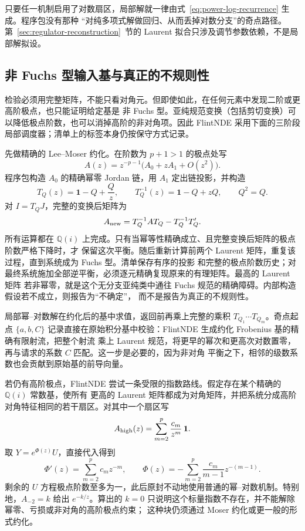 \documentclass[11pt,a4paper]{ctexart}
\newcommand{\Id}{\mathbf 1}
\renewcommand{\_}{\origunderscore\allowbreak}
\begin{document}
只要任一机制启用了对数扇区，局部解就一律由式~\eqref{eq:power-log-recurrence} 生成。程序包没有那种
“对纯多项式解做回归、从而丢掉对数分支”的奇点路径。第~\ref{sec:regulator-reconstruction}~节的 Laurent
拟合只涉及调节参数依赖，不是局部解拟设。


\subsection{非 Fuchs 型输入基与真正的不规则性}
\label{subsec:nonfuchsian}

检验必须用完整矩阵，不能只看对角元。但即使如此，在任何元素中发现二阶或更高阶极点，也只能证明给定基是
非 Fuchs 型。亚纯规范变换（包括剪切变换）可以降低极点阶数，也可以消掉高阶的非对角项。因此 FlintNDE
采用下面的三阶段局部调度器；清单上的标签本身仍按保守方式记录。

先做精确的 Lee--Moser 约化。在阶数为 $p+1>1$ 的极点处写
\begin{equation}
 A(z)=z^{-p-1}\bigl(A_0+zA_1+O(z^2)\bigr).
\end{equation}
程序包构造 $A_0$ 的精确幂零 Jordan 链，用 $A_1$ 定出链投影，并构造
\begin{equation}
 T_Q(z)=\Id-Q+\frac{Q}{z},\qquad
 T_Q^{-1}(z)=\Id-Q+zQ,\qquad Q^2=Q.
 \label{eq:moser-balance}
\end{equation}
对 $I=T_QJ$，完整的变换后矩阵为
\begin{equation}
 A_{\rm new}=T_Q^{-1}A T_Q-T_Q^{-1}T_Q'.
 \label{eq:moser-transformed-system}
\end{equation}
所有运算都在 $\mathbb Q(i)$ 上完成。只有当幂等性精确成立、且完整变换后矩阵的极点阶数严格下降时，才
保留这次平衡。随后重新计算前两个 Laurent 矩阵，重复该过程，直到系统成为 Fuchs 型。清单保存有序的投影
和完整的极点阶数历史；对最终系统施加全部逆平衡，必须逐元精确复现原来的有理矩阵。最高的 Laurent 矩阵
若非幂零，就是这个无分支亚纯类中通往 Fuchs 规范的精确障碍。内部构造假设若不成立，则报告为“不确定”，
而不是报告为真正的不规则性。

局部幂--对数解在约化后的基中求值，返回前再乘上完整的乘积 $T_{Q_1}\cdots T_{Q_m}$。奇点起点
$\{a,b,C\}$ 记录直接在原始积分基中校验：FlintNDE 生成约化 Frobenius 基的精确有限射流，把整个射流
乘上 Laurent 规范，将更早的幂次和更高次对数置零，再与请求的系数 $C$ 匹配。这一步是必要的，因为非对角
平衡之下，相邻的级数系数也会贡献到原始基的前导向量。

若仍有高阶极点，FlintNDE 尝试一条受限的指数路线。假定存在某个精确的 $\mathbb Q(i)$ 常数基，使所有
更高的 Laurent 矩阵都成为对角矩阵，并把系统分成高阶对角特征相同的若干扇区。对其中一个扇区写
\begin{equation}
  A_{\rm high}(z)=\sum_{m=2}^{p}\frac{c_m}{z^m}\,\Id.
\end{equation}
取 $Y=e^{\Phi(z)}U$，直接代入得到
\begin{equation}
  \Phi'(z)=\sum_{m=2}^{p}c_m z^{-m},\qquad
  \Phi(z)=-\sum_{m=2}^{p}\frac{c_m}{m-1}z^{-(m-1)}.
  \label{eq:implemented-exponential-factor}
\end{equation}
剩余的 $U$ 方程极点阶数至多为一，此后原封不动地使用普通的幂--对数机制。特别地，$A_{-2}=k$ 给出
$e^{-k/z}$。算出的 $k=0$ 只说明这个标量指数不存在，并不能解除幂零、亏损或非对角的高阶极点约束；
这种块仍须通过 Moser 约化或更一般的形式约化。
\end{document}
